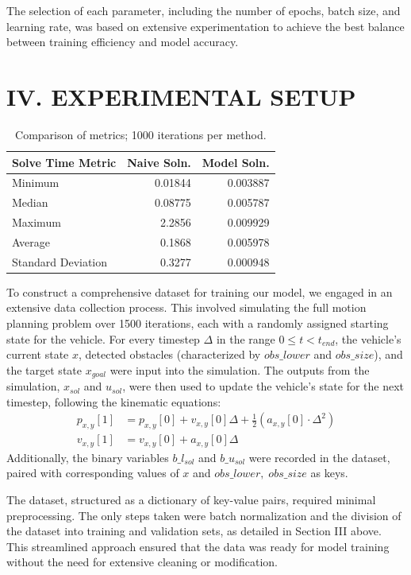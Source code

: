 \documentclass[
	letterpaper, %
	10pt, %
	unnumberedsections, %
	twoside, %
]{LTJournalArticle}
\begin{document}
The selection of each parameter, including the number of epochs, batch size, and learning rate, was based on extensive experimentation to achieve the best balance between training efficiency and model accuracy.

\section{IV. EXPERIMENTAL SETUP}

\begin{table}
    \caption{Comparison of metrics; 1000 iterations per method.}
    \centering
    \begin{tabular}{l r r}
        \toprule
        Solve Time Metric & Naive Soln. & Model Soln. \\
        \midrule
        Minimum & 0.01844  & 0.003887 \\
        Median  & 0.08775  & 0.005787 \\
        Maximum & 2.2856   & 0.009929 \\
        Average & 0.1868   & 0.005978 \\
        Standard Deviation & 0.3277 & 0.000948 \\
        \bottomrule
    \end{tabular}
\end{table}

\quad To construct a comprehensive dataset for training our model, we engaged in an extensive data collection process. This involved simulating the full motion planning problem over 1500 iterations, each with a randomly assigned starting state for the vehicle. For every timestep $\Delta$ in the range $0 \leq t < t_{end}$, the vehicle's current state $x$, detected obstacles (characterized by $obs\_lower$ and $obs\_size$), and the target state $x_{goal}$ were input into the simulation. The outputs from the simulation, $x_{sol}$ and $u_{sol}$, were then used to update the vehicle's state for the next timestep, following the kinematic equations:
\begin{align*}
    p_{x, y}[1] &= p_{x, y}[0] + v_{x, y}[0] \Delta + \frac{1}{2} (a_{x, y}[0] \cdot \Delta^2) \\
    v_{x, y}[1] &= v_{x, y}[0] + a_{x, y}[0] \Delta
\end{align*}
Additionally, the binary variables $b\_l_{sol}$ and $b\_u_{sol}$ were recorded in the dataset, paired with corresponding values of $x$ and $obs\_lower,\; obs\_size$ as keys.

The dataset, structured as a dictionary of key-value pairs, required minimal preprocessing. The only steps taken were batch normalization and the division of the dataset into training and validation sets, as detailed in Section III above. This streamlined approach ensured that the data was ready for model training without the need for extensive cleaning or modification.
\end{document}
